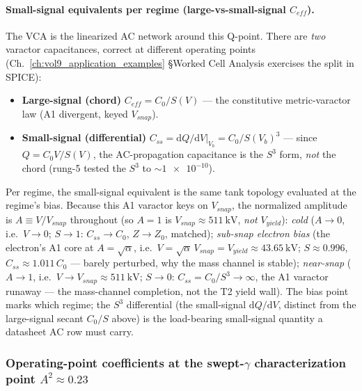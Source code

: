 \paragraph{Small-signal equivalents per regime (large-vs-small-signal $C_{eff}$).} The VCA is the linearized AC network around this Q-point. There are \emph{two} varactor capacitances, correct at different operating points (Ch.~\ref{ch:vol9_application_examples} \S Worked Cell Analysis exercises the split in SPICE):
\begin{itemize}
    \item \textbf{Large-signal (chord)} $C_{eff} = C_0/S(V)$ --- the constitutive metric-varactor law (A1 divergent, keyed $V_{snap}$).
    \item \textbf{Small-signal (differential)} $C_{ss} = \mathrm{d}Q/\mathrm{d}V|_{V_b} = C_0/S(V_b)^3$ --- since $Q = C_0 V/S(V)$, the AC-propagation capacitance is the $S^3$ form, \emph{not} the chord (rung-5 tested the $S^3$ to $\sim\!\num{1e-10}$).
\end{itemize}
Per regime, the small-signal equivalent is the same tank topology evaluated at the regime's bias. Because this A1 varactor keys on $V_{snap}$, the normalized amplitude is $A \equiv V/V_{snap}$ throughout (so $A=1$ is $V_{snap}\approx\SI{511}{\kV}$, \emph{not} $V_{yield}$): \emph{cold} ($A\to0$, i.e.\ $V\to0$; $S\to1$: $C_{ss}\to C_0$, $Z\to Z_0$, matched); \emph{sub-snap electron bias} (the electron's A1 core at $A=\sqrt\alpha$, i.e.\ $V=\sqrt\alpha\,V_{snap}=V_{yield}\approx\SI{43.65}{\kV}$; $S\approx0.996$, $C_{ss}\approx1.011\,C_0$ --- barely perturbed, why the mass channel is stable); \emph{near-snap} ($A\to1$, i.e.\ $V\to V_{snap}\approx\SI{511}{\kV}$; $S\to0$: $C_{ss}=C_0/S^3\to\infty$, the A1 varactor runaway --- the mass-channel completion, not the T2 yield wall). The bias point marks which regime; the $S^3$ differential (the small-signal $\mathrm{d}Q/\mathrm{d}V$, distinct from the large-signal secant $C_0/S$ above) is the load-bearing small-signal quantity a datasheet AC row must carry.

\subsubsection{Operating-point coefficients at the swept-$\gamma$ characterization point $A^2 \approx 0.23$}
\label{subsec:vol9_electron_op_coefficients}

